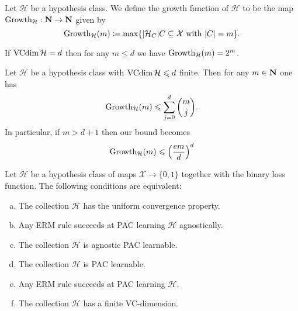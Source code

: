 \begin{definition}
\label{def:growth-function-learning}
Let \(\mathcal{H}\) be a hypothesis class. We define the growth function of \(\mathcal{H}\) to be
the map \(\operatorname{Growth}_{\mathcal{H}}: \mathbf{N} \to \mathbf{N}\) given by
\[
\operatorname{Growth}_{\mathcal{H}}(m) \coloneq \max \{|\mathcal{H}_C| \relax C \subseteq \mathcal{X} \text{ with } |C| = m\}.
\]
\end{definition}

\begin{corollary}
\label{cor:growth-function-lower-vc-dim}
If \(\operatorname{VCdim} \mathcal{H} = d\) then for any \(m \leq d\) we have \(\operatorname{Growth}_{\mathcal{H}}(m) = 2^m\).
\end{corollary}

\begin{lemma}
\label{lem:sauer-shelah-perles}
Let \(\mathcal{H}\) be a hypothesis class with \(\operatorname{VCdim} \mathcal{H} \leqslant d\) finite. Then for any
\(m \in \mathbf{N}\) one has
\[
\operatorname{Growth}_{\mathcal{H}}(m) \leqslant \sum_{j=0}^d \binom m j.
\]
In particular, if \(m > d + 1\) then our bound becomes
\[
\operatorname{Growth}_{\mathcal{H}}(m) \leqslant \Big(\frac{e m}{d}\Big)^d
\]
\end{lemma}

\begin{theorem}
\label{thm:fundamental-thm-stat-learning}
Let \(\mathcal{H}\) be a hypothesis class of maps \(\mathcal{X} \to \{0, 1\}\) together with the
binary loss function. The following conditions are equivalent:
\begin{enumerate}[(a)]\setlength\itemsep{0em}
\item The collection \(\mathcal{H}\) has the uniform convergence property.

\item Any ERM rule succeeds at PAC learning \(\mathcal{H}\) agnostically.

\item The collection \(\mathcal{H}\) is agnostic PAC learnable.

\item The collection \(\mathcal{H}\) is PAC learnable.

\item Any ERM rule succeeds at PAC learning \(\mathcal{H}\).

\item The collection \(\mathcal{H}\) has a finite VC-dimension.
\end{enumerate}
\end{theorem}

